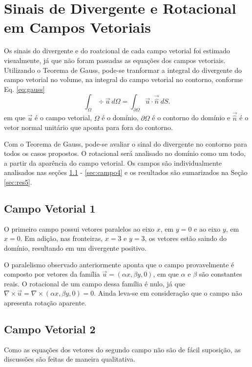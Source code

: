 \section{Sinais de Divergente e Rotacional em Campos Vetoriais}\label{sec:divrot}
Os sinais do divergente e do roatcional de cada campo vetorial foi estimado visualmente, j\'a que n\~ao foram passadas as equa\c{c}\~oes dos campos vetoriais. Utilizando o Teorema de Gauss, pode-se tranformar a integral do divergente do campo vetorial no volume, na integral do campo vetorial no contorno, conforme Eq. \eqref{eq:gauss}
\begin{equation}
    \int_\Omega \div{\vec{u}} ~d\Omega = \int_{\partial \Omega} \vec{u}\cdot \vec{\hat{n}} ~dS.
    \label{eq:gauss}
\end{equation}
em que $\vec{u}$ \'e o campo vetorial, $\Omega$ \'e o dom\'inio, $\partial \Omega$ \'e o contorno do dom\'inio e $\vec{\hat{n}}$ \'e o vetor normal unit\'ario que aponta para fora do contorno.

Com o Teorema de Gauss, pode-se avaliar o sinal do divergente no contorno para todos os casos propostos. O rotacional ser\'a analisado no dom\'inio como um todo, a partir da apar\^encia do campo vetorial. Os campos s\~ao individualmente analisados nas se\c{c}\~oes \ref{sec:campo1} - \ref{sec:campo4} e os resultados s\~ao sumarizados na Se\c{c}\~ao \ref{sec:res5}.

\subsection{Campo Vetorial 1} \label{sec:campo1}
O primeiro campo possui vetores paralelos ao eixo $x$, em $y = 0$ e ao eixo $y$, em $x = 0$. Em adi\c{c}\~ao, nas fronteiras, $x = 3$ e $y = 3$, os vetores est\~ao saindo do dom\'inio, resultando em um divergente positivo. 

O paralelismo observado anteriormente aponta que o campo provavelmente \'e composto por vetores da fam\'ilia $\vec{u} = (\alpha x, \beta y, 0)$, em que $\alpha$ e $\beta$ s\~ao constantes reais. O rotacional de um campo dessa fam\'ilia \'e nulo, j\'a que $\nabla \times \vec{u} = \nabla \times (\alpha x, \beta y, 0) = 0$. Ainda leva-se em considera\c{c}\~ao que o campo n\~ao apresenta rota\c{c}\~ao aparente.

\subsection{Campo Vetorial 2} \label{sec:campo2}
Como as equa\c{c}\~oes dos vetores do segundo campo n\~ao s\~ao de f\'acil suposi\c{c}\~ao, as discuss\~oes s\~ao feitas de maneira qualitativa.

